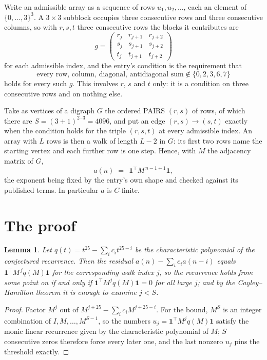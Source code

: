 \documentclass[11pt,a4paper]{article}
\theoremstyle{plain}
\newtheorem{lemma}[theorem]{Lemma}
\theoremstyle{definition}
\begin{document}
Write an admissible array as a sequence of rows $u_1,u_2,\dots$, each an element of
$\{0,\dots,3\}^{3}$. A $3\times3$ subblock occupies three consecutive rows and
three consecutive columns, so with $r,s,t$ three consecutive rows the blocks it
contributes are
\[
g=\begin{pmatrix}r_j&r_{j+1}&r_{j+2}\\ s_j&s_{j+1}&s_{j+2}\\ t_j&t_{j+1}&t_{j+2}\end{pmatrix}
\]
for each admissible index, and the entry's condition is the requirement that
\[
\text{every row, column, diagonal, antidiagonal sum} \notin \{0,2,3,6,7\}
\]
holds for every such $g$. This involves $r$, $s$ and $t$ only: it is a condition on
three consecutive rows and on nothing else.

Take as vertices of a digraph $G$ the ordered PAIRS $(r,s)$ of rows, of which there are
$S=(3+1)^{2\cdot3}=4096$, and put an edge $(r,s)\to(s,t)$ exactly when the condition
holds for the triple $(r,s,t)$ at every admissible index. An array with $L$ rows is then a
walk of length $L-2$ in $G$: its first two rows name the starting vertex and each further
row is one step. Hence, with $M$ the adjacency matrix of $G$,
\[
a(n)\;=\;\,\mathbf{1}^{\!\top}M^{\,n-1+1}\mathbf{1},
\]
the exponent being fixed by the entry's own shape and checked against its published terms.
In particular $a$ is $C$-finite.

\section{The proof}

\begin{lemma}\label{lem:crit}
Let $q(t)=t^{25}-\sum_i c_it^{25-i}$ be the characteristic polynomial of the
conjectured recurrence. Then the residual $a(n)-\sum_ic_ia(n-i)$ equals
$\mathbf{1}^{\!\top}M^{\,j}q(M)\mathbf{1}$ for the corresponding walk index
$j$, so the recurrence holds from some point on if and only if
$\mathbf{1}^{\!\top}M^{j}q(M)\mathbf{1}=0$ for all large $j$; and by the
Cayley--Hamilton theorem it is enough to examine $j<S$.
\end{lemma}

\begin{proof}
Factor $M^{j}$ out of $M^{j+25}-\sum_ic_iM^{j+25-i}$. For the bound, $M^{S}$
is an integer combination of $I,M,\dots,M^{S-1}$, so the numbers
$u_j=\mathbf{1}^{\!\top}M^{j}q(M)\mathbf{1}$ satisfy the monic linear recurrence given by
the characteristic polynomial of $M$; $S$ consecutive zeros therefore force every later one,
and the last nonzero $u_j$ pins the threshold exactly.
\end{proof}
\end{document}
